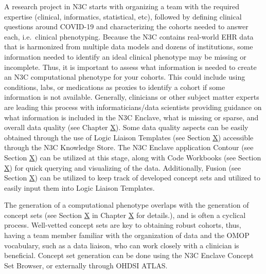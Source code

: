 \documentclass[
  letterpaper,
  DIV=11,
  numbers=noendperiod]{scrreprt}
\begin{document}
A research project in N3C starts with organizing a team with the
required expertise (clinical, informatics, statistical, etc), followed
by defining clinical questions around COVID-19 and characterizing the
cohorts needed to answer each, i.e.~clinical phenotyping. Because the
N3C contains real-world EHR data that is harmonized from multiple data
models and dozens of institutions, some information needed to identify
an ideal clinical phenotype may be missing or incomplete. Thus, it is
important to assess what information is needed to create an N3C
computational phenotype for your cohorts. This could include using
conditions, labs, or medications as proxies to identify a cohort if some
information is not available. Generally, clinicians or other subject
matter experts are leading this process with informaticians/data
scientists providing guidance on what information is included in the N3C
Enclave, what is missing or sparse, and overall data quality (see
Chapter
\protect\hyperlink{Best-Practices-and-Important-Data-Considerations}{X}).
Some data quality aspects can be easily obtained through the use of
Logic Liaison Templates (see Section
\protect\hyperlink{Logic-Liaison-Fact-Tables-and-Templates}{X})
accessible through the N3C Knowledge Store. The N3C Enclave application
Contour (see Section \protect\hyperlink{Contour}{X}) can be utilized at
this stage, along with Code Workbooks (see Section
\protect\hyperlink{Code-Workbooks}{X}) for quick querying and
visualizing of the data. Additionally, Fusion (see Section
\protect\hyperlink{Fusion}{X}) can be utilized to keep track of
developed concept sets and utilized to easily input them into Logic
Liaison Templates.

The generation of a computational phenotype overlaps with the generation
of concept sets (see Section \protect\hyperlink{Concept-Sets}{X} in
Chapter \protect\hyperlink{Understanding-the-Data}{X} for details.), and
is often a cyclical process. Well-vetted concept sets are key to
obtaining robust cohorts, thus, having a team member familiar with the
organization of data and the OMOP vocabulary, such as a data liaison,
who can work closely with a clinician is beneficial. Concept set
generation can be done using the N3C Enclave Concept Set Browser, or
externally through OHDSI ATLAS.
\end{document}
